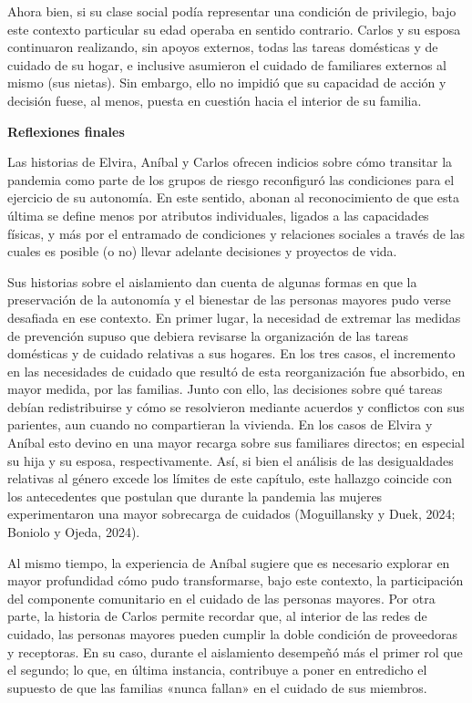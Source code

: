 Ahora bien, si su clase social podía representar una condición de privilegio, bajo este contexto particular su edad operaba en sentido contrario. Carlos y su esposa continuaron realizando, sin apoyos externos, todas las tareas domésticas y de cuidado de su hogar, e inclusive asumieron el cuidado de familiares externos al mismo (sus nietas). Sin embargo, ello no impidió que su capacidad de acción y decisión fuese, al menos, puesta en cuestión hacia el interior de su familia.

\textbf{Reflexiones finales}

Las historias de Elvira, Aníbal y Carlos ofrecen indicios sobre cómo transitar la pandemia como parte de los grupos de riesgo reconfiguró las condiciones para el ejercicio de su autonomía. En este sentido, abonan al reconocimiento de que esta última se define menos por atributos individuales, ligados a las capacidades físicas, y más por el entramado de condiciones y relaciones sociales a través de las cuales es posible (o no) llevar adelante decisiones y proyectos de vida.

Sus historias sobre el aislamiento dan cuenta de algunas formas en que la preservación de la autonomía y el bienestar de las personas mayores pudo verse desafiada en ese contexto. En primer lugar, la necesidad de extremar las medidas de prevención supuso que debiera revisarse la organización de las tareas domésticas y de cuidado relativas a sus hogares. En los tres casos, el incremento en las necesidades de cuidado que resultó de esta reorganización fue absorbido, en mayor medida, por las familias. Junto con ello, las decisiones sobre qué tareas debían redistribuirse y cómo se resolvieron mediante acuerdos y conflictos con sus parientes, aun cuando no compartieran la vivienda. En los casos de Elvira y Aníbal esto devino en una mayor recarga sobre sus familiares directos; en especial su hija y su esposa, respectivamente. Así, si bien el análisis de las desigualdades relativas al género excede los límites de este capítulo, este hallazgo coincide con los antecedentes que postulan que durante la pandemia las mujeres experimentaron una mayor sobrecarga de cuidados (Moguillansky y Duek, 2024; Boniolo y Ojeda, 2024).

Al mismo tiempo, la experiencia de Aníbal sugiere que es necesario explorar en mayor profundidad cómo pudo transformarse, bajo este contexto, la participación del componente comunitario en el cuidado de las personas mayores. Por otra parte, la historia de Carlos permite recordar que, al interior de las redes de cuidado, las personas mayores pueden cumplir la doble condición de proveedoras y receptoras. En su caso, durante el aislamiento desempeñó más el primer rol que el segundo; lo que, en última instancia, contribuye a poner en entredicho el supuesto de que las familias «nunca fallan» en el cuidado de sus miembros.

